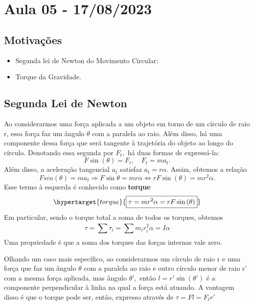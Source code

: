 \documentclass{article}
\begin{document}
\section{Aula 05 - 17/08/2023}
\subsection{Motivações }
\begin{itemize}
  \item Segunda lei de Newton do Movimento Circular;
  \item Torque da Gravidade.
\end{itemize}
\subsection{Segunda Lei de Newton}
Ao considerarmos uma força aplicada a um objeto em torno de um círculo de raio r, essa força faz um ângulo
 \(\theta \) com a paralela ao raio. Além disso, há uma componente dessa força que será tangente 
 à trajetória do objeto ao longo do círculo. Denotando essa segunda por \(F_{t},\) há duas formas de expressá-la: 
   \[
     F\sin{(\theta )} = F_{t},\quad F_{t} = ma_{t}.
   \]
   Além disso, a aceleração tangencial \(a_{t}\) satisfaz \(a_{t} = r\alpha \). Assim, obtemos a relação 
     \[
       F sin(\theta ) = ma_{t} \Rightarrow F\sin{\theta } = mr\alpha \Longleftrightarrow rF\sin{(\theta )} = mr^{2}\alpha.
     \]
     Esse termo à esquerda é conhecido como \textbf{torque} 
       \[
         \hypertarget{torque}{\boxed{\tau = mr^{2}\alpha = rF\sin{(\theta )}}}
       \]
  Em particular, sendo o torque total a soma de todos os torques, obtemos 
    \[
      \tau = \sum\limits_{}^{}\tau_{i} = \sum\limits_{}^{}m_{i}r_{i}^{2}\alpha = I\alpha 
    \]
    Uma propriedade é que a soma dos torques das forças internas vale zero.

    Olhando um caso mais específico, ao considerarmos um círculo de raio r e uma força que
faz um ângulo \(\theta \) com a paralela ao raio e outro círculo menor de raio r' com a mesma força aplicada,
mas ângulo \(\theta ',\) então \(l=r'\sin{(\theta ')}\) é a componente perpendicular à linha na qual a força está atuando.
  A vantagem disso é que o torque pode ser, então, expresso através de \(\tau = Fl = F_{t}r'\)
\end{document}
